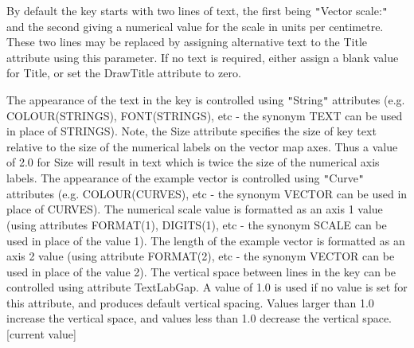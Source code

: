 \documentclass[twoside,11pt]{starlink}
\begin{document}
{{{         By default the key starts with two lines of text, the first
         being \texttt{"}Vector scale:\texttt{"} and the second giving a numerical value
         for the scale in units per centimetre. These two lines may be
         replaced by assigning alternative text to the Title attribute
         using this parameter. If no text is required, either assign a
         blank value for Title, or set the DrawTitle attribute to zero.

         The appearance of the text in the key is controlled using \texttt{"}String\texttt{"}
         attributes (e.g. COLOUR(STRINGS), FONT(STRINGS), etc - the synonym
         TEXT can be used in place of STRINGS). Note, the Size attribute
         specifies the size of key text relative to the size of the numerical
         labels on the vector map axes. Thus a value of 2.0 for Size will
         result in text which is twice the size of the numerical axis labels.
         The appearance of the example vector is controlled using \texttt{"}Curve\texttt{"}
         attributes (e.g. COLOUR(CURVES), etc - the synonym VECTOR can be
         used in place of CURVES). The numerical scale value is formatted as
         an axis 1 value (using attributes FORMAT(1), DIGITS(1), etc - the
         synonym SCALE can be used in place of the value 1). The length of
         the example vector is formatted as an axis 2 value (using attribute
         FORMAT(2), etc - the synonym VECTOR can be used in place of the
         value 2). The vertical space between lines in the key can be
         controlled using attribute TextLabGap. A value of 1.0 is used if
         no value is set for this attribute, and produces default vertical
         spacing. Values larger than 1.0 increase the vertical space, and
         values less than 1.0 decrease the vertical space. [current value]
      }
      }}
\end{document}
